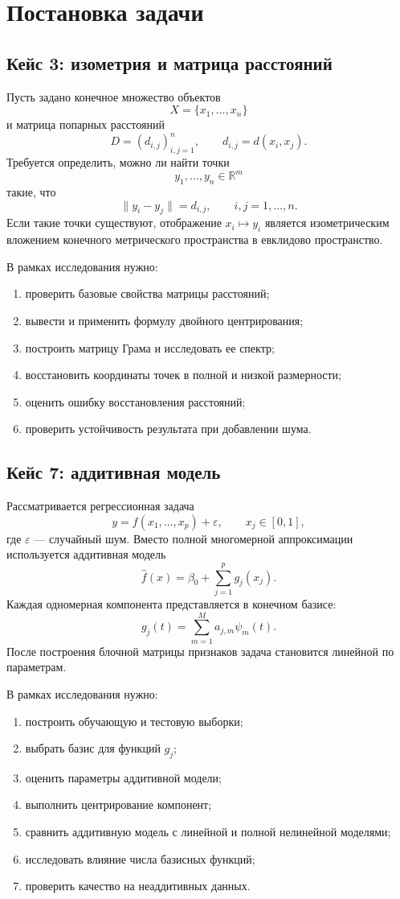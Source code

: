 \documentclass[12pt,a4paper]{article}
\newcommand{\R}{\mathbb{R}}
\newcommand{\eps}{\varepsilon}
\begin{document}
\section{Постановка задачи}

\subsection{Кейс 3: изометрия и матрица расстояний}

Пусть задано конечное множество объектов
\[
    X=\{x_1,\ldots,x_n\}
\]
и матрица попарных расстояний
\[
    D=(d_{i,j})_{i,j=1}^{n}, \qquad d_{i,j}=d(x_i,x_j).
\]
Требуется определить, можно ли найти точки
\[
    y_1,\ldots,y_n\in\R^m
\]
такие, что
\[
    \|y_i-y_j\|=d_{i,j}, \qquad i,j=1,\ldots,n.
\]
Если такие точки существуют, отображение \(x_i\mapsto y_i\) является
изометрическим вложением конечного метрического пространства в евклидово
пространство.

В рамках исследования нужно:
\begin{enumerate}[label=\arabic*)]
    \item проверить базовые свойства матрицы расстояний;
    \item вывести и применить формулу двойного центрирования;
    \item построить матрицу Грама и исследовать ее спектр;
    \item восстановить координаты точек в полной и низкой размерности;
    \item оценить ошибку восстановления расстояний;
    \item проверить устойчивость результата при добавлении шума.
\end{enumerate}

\subsection{Кейс 7: аддитивная модель}

Рассматривается регрессионная задача
\[
    y=f(x_1,\ldots,x_p)+\eps,\qquad x_j\in[0,1],
\]
где \(\eps\) --- случайный шум. Вместо полной многомерной аппроксимации
используется аддитивная модель
\[
    \widehat f(x)=\beta_0+\sum\limits_{j=1}^{p}g_j(x_j).
\]
Каждая одномерная компонента представляется в конечном базисе:
\[
    g_j(t)=\sum\limits_{m=1}^{M}a_{j,m}\psi_m(t).
\]
После построения блочной матрицы признаков задача становится линейной по
параметрам.

В рамках исследования нужно:
\begin{enumerate}[label=\arabic*)]
    \item построить обучающую и тестовую выборки;
    \item выбрать базис для функций \(g_j\);
    \item оценить параметры аддитивной модели;
    \item выполнить центрирование компонент;
    \item сравнить аддитивную модель с линейной и полной нелинейной моделями;
    \item исследовать влияние числа базисных функций;
    \item проверить качество на неаддитивных данных.
\end{enumerate}
\end{document}
